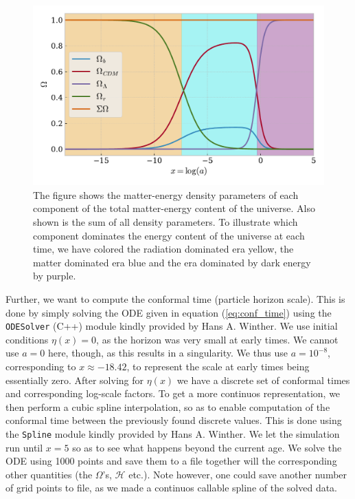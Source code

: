 \documentclass[twocolumn]{aastex62}
\begin{document}
\begin{figure}
    \includegraphics[scale=1]{Figures/Omegas_of_x.pdf}
    \caption{The figure shows the matter-energy density parameters of each component of the total matter-energy content of the universe. Also shown is the sum of all density parameters. To illustrate which component dominates the energy content of the universe at each time, we have colored the radiation dominated era yellow, the matter dominated era blue and the era dominated by dark energy by purple.}
    \label{fig:Omegas}
\end{figure}

Further, we want to compute the conformal time (particle horizon scale). This is
done by simply solving the ODE given in equation (\ref{eq:conf_time}) using the
\texttt{ODESolver} (C++) module kindly provided by Hans A. Winther. We use initial
conditions $\eta(x) = 0$, as the horizon was very small at early times. We
cannot use $a = 0$ here, though, as this results in a singularity. We thus use
$a = 10^{-8}$, corresponding to $x \approx -18.42$, to represent the scale at
early times being essentially zero. 
After solving for $\eta(x)$ we have a discrete set of conformal times and
corresponding log-scale factors. To get a more continuos representation, we then
perform a cubic spline interpolation, so as to enable computation of the
conformal time between the previously found discrete values. This is done using
the \texttt{Spline} module kindly provided by Hans A. Winther. 
We let the simulation run until $x = 5$ so as to see what happens
beyond the current age. We solve the ODE using 1000 points and save them to a
file together will the corresponding other quantities (the $\Omega$'s, $\mathcal{H}$ etc.). 
Note however, one could save another number of grid points to file, as we made a continuos 
callable spline of the solved data.
\end{document}
